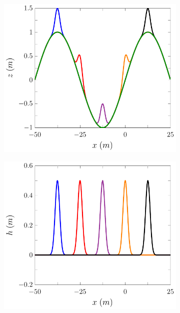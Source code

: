 \begin{figure}
	\centering
	\begin{subfigure}{0.5\textwidth}
		\includegraphics[width=\textwidth]{./chp5/figures/Forced/Dry/FEVMw.pdf}
		\vspace{0.5cm}
	\end{subfigure}%
	\begin{subfigure}{0.5\textwidth}
		\includegraphics[width=\textwidth]{./chp5/figures/Forced/Dry/FEVMh.pdf}

\end{subfigure}
\end{figure}
